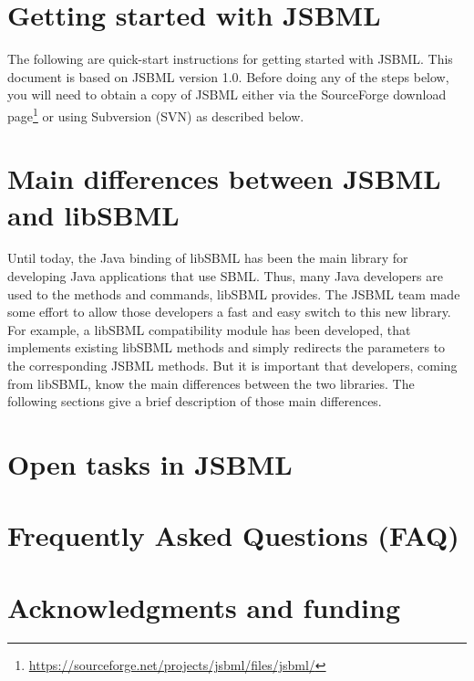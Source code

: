 \documentclass[
  BCOR12mm,
  letterpaper,
  11pt,
  headsepline,
  numbers=noenddot,
  caption=oneline,
  headinclude,
  appendixprefix,
  index=totoc,
  bibliography=totoc,
  twoside,
  titlepage
]{scrreprt}
\begin{document}
\tableofcontents

\chapter{Getting started with JSBML}

The following are quick-start instructions for getting started with JSBML. This
document is based on JSBML version 1.0. Before doing any of the steps below,
you will need to obtain a copy of JSBML either via the SourceForge download
page\footnote{\url{https://sourceforge.net/projects/jsbml/files/jsbml/}} or using
Subversion (SVN) as described below.





\chapter{Main differences between JSBML and libSBML}

Until today, the Java binding of libSBML has been the main library for
developing Java applications that use SBML. Thus, many Java developers are used
to the methods and commands, libSBML provides. The JSBML team made some effort
to allow those developers a fast and easy switch to this new library. For
example, a libSBML compatibility module has been developed, that implements
existing libSBML methods and simply redirects the parameters to the
corresponding JSBML methods. But it is important that developers, coming from
libSBML, know the main differences between the two libraries. The following
sections give a brief description of those main differences.





\chapter{Open tasks in JSBML}



\appendix

\chapter{Frequently Asked Questions (FAQ)}


\chapter{Acknowledgments and funding}






\printindex
\end{document}
